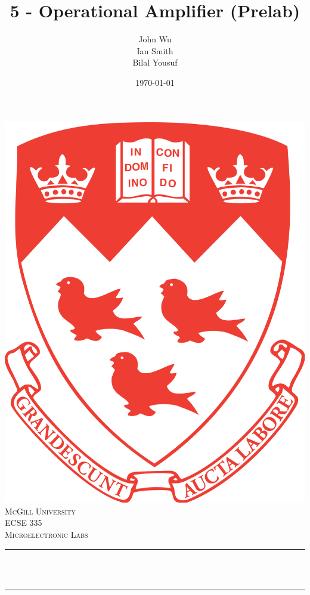 \documentclass[12pt]{article}
\title{5 - Operational Amplifier (Prelab)}                             %
\author{John Wu \\ Ian Smith \\ Bilal Yousuf}                               %
\date{\today}                                                           %
\makeatletter
\let\thetitle\@title
\makeatother
\begin{document}

\begin{titlepage}
    \centering
    \vspace*{0.5 cm}
    \includegraphics[scale = 0.07]{mcgill-logo.png}\\[1.0 cm]   %
    \textsc{\LARGE McGill University}\\[1.0 cm]   %
    \textsc{\Large ECSE 335}\\[0.5 cm]               %
    \textsc{\large Microelectronic Labs}\\[0.5 cm]               %
    \rule{\linewidth}{0.2 mm} \\[0.4 cm]
    { \huge \bfseries \thetitle}\\
    \rule{\linewidth}{0.2 mm} \\[1.5 cm]
    \begin{minipage}{0.4\textwidth}
        \begin{flushleft} \large

\end{flushleft}
\end{minipage}
\end{titlepage}
\end{document}
